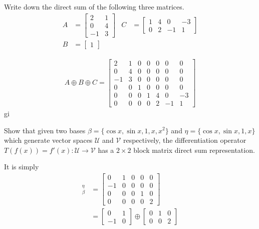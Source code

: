 \begin{Exercise}
Write down the direct sum of the following three matrices.
\begin{align*}
A &= 
\begin{bmatrix}
2 & 1 \\
0 & 4 \\
-1 & 3
\end{bmatrix} &
C &= 
\begin{bmatrix}
1 & 4 & 0 & -3 \\
0 & 2 & -1 & 1
\end{bmatrix} \\
B &= \begin{bmatrix}
1
\end{bmatrix}
\end{align*}
\end{Exercise}
\begin{Answer}
\begin{align*}
A \oplus B \oplus C =
\begin{bmatrix}
2 & 1 & 0 & 0 & 0 & 0 & 0\\
0 & 4 & 0 & 0 & 0 & 0 & 0\\
-1 & 3 & 0 & 0 & 0 & 0 & 0\\
0 & 0 & 1 & 0 & 0 & 0 & 0\\
0 & 0 & 0 & 1 & 4 & 0 & -3 \\
0 & 0 & 0 & 0 & 2 & -1 & 1
\end{bmatrix}
\end{align*}gi
\end{Answer}

\begin{Exercise}
Show that given two bases $\mathcal{\beta} = \{\cos x, \sin x, 1, x, x^2\}$ and $\mathcal{\eta} = \{\cos x, \sin x, 1, x\}$ which generate vector spaces $\mathcal{U}$ and $\mathcal{V}$ respectively, the differentiation operator $T(f(x)) = f'(x): \mathcal{U} \to \mathcal{V}$ has a $2 \times 2$ block matrix direct sum representation.
\end{Exercise}
\begin{Answer}
It is simply
\begin{align*}
[T]_{\beta}^{\eta} &=
\begin{bmatrix}
0 & 1 & 0 & 0 &0\\
-1 & 0 & 0 & 0 & 0\\
0 & 0 & 0 & 1 & 0\\
0 & 0 & 0 & 0 & 2
\end{bmatrix} \\
&=
\begin{bmatrix}
0 & 1 \\
-1 & 0 
\end{bmatrix}
\oplus
\begin{bmatrix}
0 & 1 & 0\\    
0 & 0 & 2
\end{bmatrix}
\end{align*}
\end{Answer}